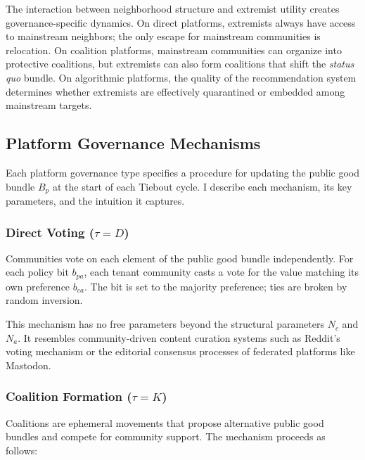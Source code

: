 \documentclass{article}
\begin{document}
\noindent The interaction between neighborhood structure and extremist utility creates governance-specific dynamics. On direct platforms, extremists always have access to mainstream neighbors; the only escape for mainstream communities is relocation. On coalition platforms, mainstream communities can organize into protective coalitions, but extremists can also form coalitions that shift the \textit{status quo} bundle. On algorithmic platforms, the quality of the recommendation system determines whether extremists are effectively quarantined or embedded among mainstream targets.

\subsection{Platform Governance Mechanisms}
\label{sec:governance}

Each platform governance type specifies a procedure for updating the public good bundle $B_p$ at the start of each Tiebout cycle. I describe each mechanism, its key parameters, and the intuition it captures.

\subsubsection{Direct Voting ($\tau = D$)}

Communities vote on each element of the public good bundle independently. For each policy bit $b_{pa}$, each tenant community casts a vote for the value matching its own preference $b_{ca}$. The bit is set to the majority preference; ties are broken by random inversion.

This mechanism has no free parameters beyond the structural parameters $N_c$ and $N_a$. It resembles community-driven content curation systems such as Reddit's voting mechanism or the editorial consensus processes of federated platforms like Mastodon.

\subsubsection{Coalition Formation ($\tau = K$)}

Coalitions are ephemeral movements that propose alternative public good bundles and compete for community support. The mechanism proceeds as follows:
\end{document}
